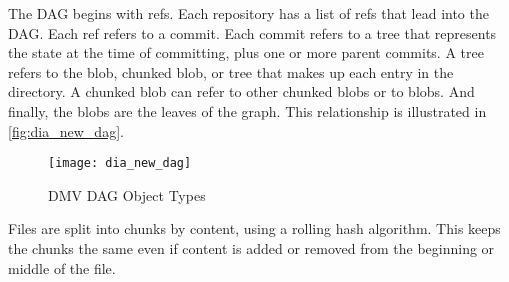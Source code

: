 The DAG begins with refs. Each repository has a list of refs that lead into the
DAG. Each ref refers to a commit. Each commit refers to a tree that represents
the state at the time of committing, plus one or more parent commits. A tree
refers to the blob, chunked blob, or tree that makes up each entry in the
directory. A chunked blob can refer to other chunked blobs or to blobs. And
finally, the blobs are the leaves of the graph. This relationship is illustrated
in \autoref{fig:dia_new_dag}.


\begin{figure}[h]
    \centering
        \texttt{[image: dia\_new\_dag]}
    \caption{DMV DAG Object Types}
    \label{fig:dia_new_dag}
\end{figure}



Files are split into chunks by content, using a rolling hash algorithm. This
keeps the chunks the same even if content is added or removed from the beginning
or middle of the file.






